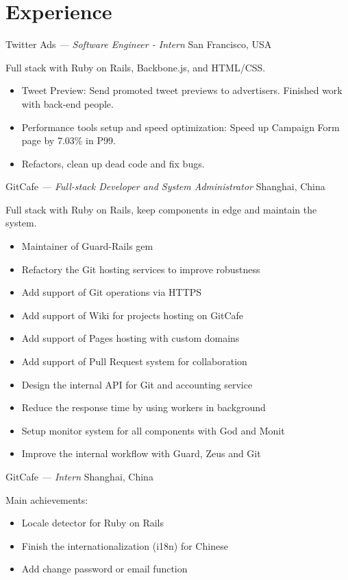 \documentclass[]{friggeri-cv} %
\begin{document}

\section{Experience}

\begin{entrylist}
  {Twitter Ads \emph{--- Software Engineer - Intern}}
  {San Francisco, USA}
  {
    Full stack with Ruby on Rails, Backbone.js, and HTML/CSS.
    \begin{itemize}
      \item Tweet Preview: Send promoted tweet previews to advertisers. Finished work with back-end people.
      \item Performance tools setup and speed optimization: Speed up Campaign Form page by 7.03\% in P99.
      \item Refactors, clean up dead code and fix bugs.
    \end{itemize}
  }
  {GitCafe \emph{--- Full-stack Developer and System Administrator}}
  {Shanghai, China}
  {
    Full stack with Ruby on Rails, keep components in edge and maintain the system.
    \begin{itemize}
    \item Maintainer of Guard-Rails gem
    \item Refactory the Git hosting services to improve robustness
    \item Add support of Git operations via HTTPS
    \item Add support of Wiki for projects hosting on GitCafe
    \item Add support of Pages hosting with custom domains
    \item Add support of Pull Request system for collaboration
    \item Design the internal API for Git and accounting service
    \item Reduce the response time by using workers in background
    \item Setup monitor system for all components with God and Monit
    \item Improve the internal workflow with Guard, Zeus and Git
    \end{itemize}
  }
  {GitCafe \emph{--- Intern}}
  {Shanghai, China}
  {
    Main achievements:
    \begin{itemize}
    \item Locale detector for Ruby on Rails
    \item Finish the internationalization (i18n) for Chinese
    \item Add change password or email function
    \end{itemize}
  }
\end{entrylist}
\end{document}

